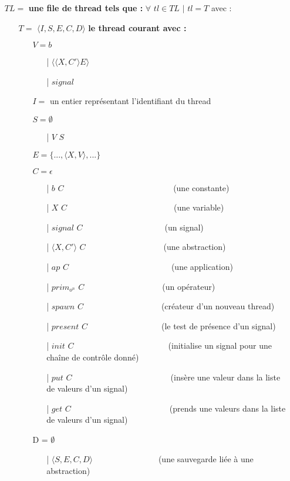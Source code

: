 \documentclass[10pt,a4paper]{article}
\begin{document}
		\begin{itemize}
			\item[] $TL =$ \textbf{une file de thread tels que :} $\forall$ $tl \in TL$ $|$ $tl = T$ avec :
			\begin{itemize}
			  \item[] $T =$ $\langle I,S,E,C,D\rangle$ \textbf{le thread courant avec :}
			  \begin{itemize}
			  	\item[] $V = b$	
			  	\begin{itemize}
			  		\item[|] $\langle\langle X,C' \rangle E\rangle$
			  		\item[|] $signal$
			  	\end{itemize}
			  	\item[] $I =$ un entier représentant l'identifiant du thread
			  	\item[] $S =  \emptyset$ 
			  	\begin{itemize}
			  		\item[|] $V$ $S$
			  	\end{itemize}
			  	\item[] $E = \{...,\langle X,V\rangle,...\}$
			  	\item[] $C = \epsilon$
			  	\begin{itemize}
			  		\item[|] $b$ $C$~~~~~~~~~~~~~~~~~~~~~~~~~~    (une constante)
			  		\item[|] $X$ $C$~~~~~~~~~~~~~~~~~~~~~~~~~~(une variable)
			  		\item[|] $signal$ $C$~~~~~~~~~~~~~~~~~~~~(un signal)
			  		\item[|] $\langle X,C'\rangle$ $C$~~~~~~~~~~~~~~~~~~~(une abstraction)
			  		\item[|] $ap$ $C$~~~~~~~~~~~~~~~~~~~~~~~~~(une application)
			  		\item[|] $prim_{o^{n}}$ $C$~~~~~~~~~~~~~~~~~~~(un opérateur)
			  		\item[|] $spawn$ $C$~~~~~~~~~~~~~~~~~~~(créateur d'un nouveau thread)
			  		\item[|] $present$ $C$~~~~~~~~~~~~~~~~~~(le test de présence d'un signal)
			  		\item[|] $init$ $C$~~~~~~~~~~~~~~~~~~~~~~~(initialise un signal pour une chaîne de contrôle donné)
			  		\item[|] $put$ $C$~~~~~~~~~~~~~~~~~~~~~~~~(insère une valeur dans la liste de valeurs d'un signal)
			  		\item[|] $get$ $C$~~~~~~~~~~~~~~~~~~~~~~~~(prends une valeurs dans la liste de valeurs d'un signal)
			  	\end{itemize}
			  	\item[] D = $\emptyset$
			  	\begin{itemize}
			  		\item[|] $\langle S,E,C,D\rangle$~~~~~~~~~~~~~~~~(une sauvegarde liée à une abstraction)
			  	\end{itemize}
			  \end{itemize}	
			\end{itemize}
			

\end{itemize}
\end{document}
